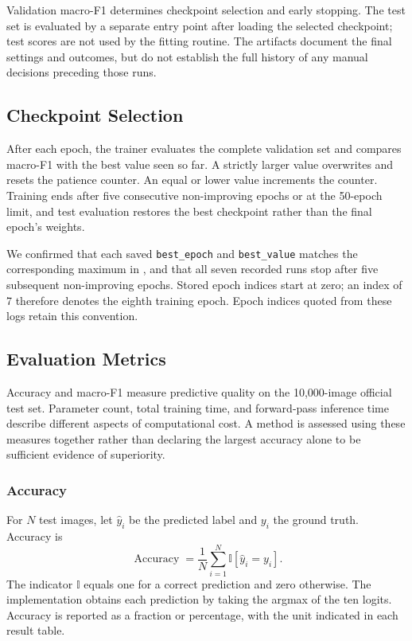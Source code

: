 Validation macro-F1 determines checkpoint selection and early stopping. The test set is evaluated by a separate entry point after loading the selected checkpoint; test scores are not used by the fitting routine. The artifacts document the final settings and outcomes, but do not establish the full history of any manual decisions preceding those runs.

\subsection{Checkpoint Selection}

After each epoch, the trainer evaluates the complete validation set and compares macro-F1 with the best value seen so far. A strictly larger value overwrites  and resets the patience counter. An equal or lower value increments the counter. Training ends after five consecutive non-improving epochs or at the 50-epoch limit, and test evaluation restores the best checkpoint rather than the final epoch's weights.

We confirmed that each saved \texttt{best\_epoch} and \texttt{best\_value} matches the corresponding maximum in , and that all seven recorded runs stop after five subsequent non-improving epochs. Stored epoch indices start at zero; an index of 7 therefore denotes the eighth training epoch. Epoch indices quoted from these logs retain this convention.

\subsection{Evaluation Metrics}

Accuracy and macro-F1 measure predictive quality on the 10,000-image official test set. Parameter count, total training time, and forward-pass inference time describe different aspects of computational cost. A method is assessed using these measures together rather than declaring the largest accuracy alone to be sufficient evidence of superiority.

\subsubsection{Accuracy}

For $N$ test images, let $\widehat{y}_i$ be the predicted label and $y_i$ the ground truth. Accuracy is
\begin{equation}
    \operatorname{Accuracy}
    =\frac{1}{N}\sum_{i=1}^{N}\mathbb{I}\!\left[\widehat{y}_i=y_i\right].
\end{equation}
The indicator $\mathbb{I}$ equals one for a correct prediction and zero otherwise. The implementation obtains each prediction by taking the argmax of the ten logits. Accuracy is reported as a fraction or percentage, with the unit indicated in each result table.

